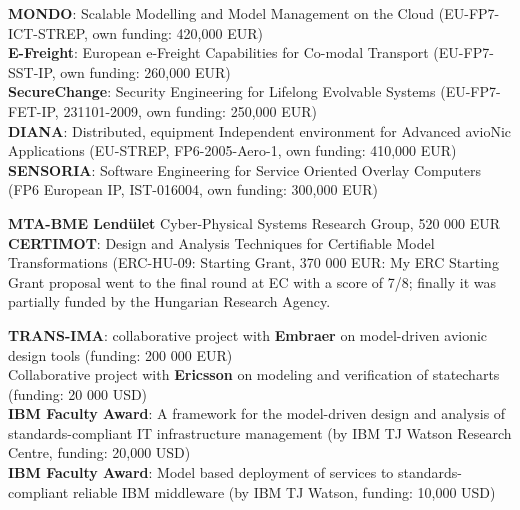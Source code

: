 \documentclass{xetexCV}
\begin{document}
\textbf{MONDO}:  Scalable Modelling and Model Management 
on the Cloud (EU-FP7-ICT-STREP, own funding: 420,000 EUR)  \\
\textbf{E-Freight}: European e-Freight Capabilities for
Co-modal Transport (EU-FP7-SST-IP, own funding: 260,000 EUR)  \\
\textbf{SecureChange}: Security Engineering for Lifelong
Evolvable Systems (EU-FP7-FET-IP, 231101-2009, own funding: 250,000 EUR)  \\ 
\textbf{DIANA}: Distributed, equipment Independent
environment for Advanced avioNic Applications (EU-STREP, FP6-2005-Aero-1, own funding: 410,000 EUR) \\
\textbf{SENSORIA}: Software Engineering for Service Oriented
Overlay Computers (FP6 European IP, IST-016004, own funding: 300,000 EUR)  



\textbf{MTA-BME Lend\"ulet}  Cyber-Physical Systems Research Group, 520 000 EUR\\

\textbf{CERTIMOT}: Design and Analysis Techniques for
Certifiable Model Transformations (ERC-HU-09: Starting Grant, 370 000 EUR: My
ERC Starting Grant proposal went to the final round at EC with a score of 7/8;
finally it was partially funded by the Hungarian Research Agency.



\textbf{TRANS-IMA}: collaborative project with \textbf{Embraer} on
model-driven avionic design tools (funding: 200 000 EUR) \\

Collaborative project with \textbf{Ericsson} on
modeling and verification of statecharts (funding: 20 000 USD)\\

\textbf{IBM Faculty Award}: A framework for the model-driven design
and analysis of standards-compliant IT infrastructure management (by IBM TJ Watson Research Centre,
funding: 20,000 USD)  \\

\textbf{IBM Faculty Award}: Model based deployment of services to
standards-compliant reliable IBM middleware (by IBM TJ Watson,
funding: 10,000 USD)  \\
\end{document}
